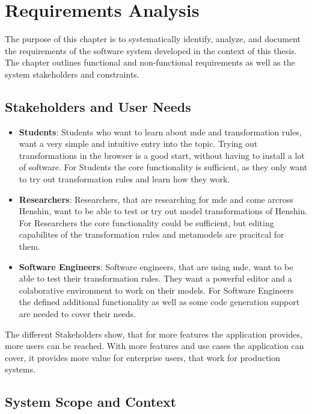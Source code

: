   \chapter{Requirements Analysis}
  \label{subsec:requirements}

  The purpose of this chapter is to systematically identify, analyze, and document the requirements of the software system developed in the context of this thesis. The chapter outlines functional and non-functional requirements as well as the system stakeholders and constraints.

\section{Stakeholders and User Needs}
  \label{subsec:stakeholders}

  \begin{itemize}
    \item \textbf{Students}: Students who want to learn about \ac{mde} and transformation rules, want a very simple and intuitive entry into the topic. Trying out transformations in the browser is a good start, without having to install a lot of software. For Students the core functionality is sufficient, as they only want to try out transformation rules and learn how they work.
    \item \textbf{Researchers}: Researchers, that are researching for \ac{mde} and come arcross Henshin, want to be able to test or try out model transformations of Henshin. For Researchers the core functionality could be sufficient, but editing capabilites of the transformation rules and metamodels are pracitcal for them.
    \item \textbf{Software Engineers}: Software engineers, that are using \ac{mde}, want to be able to test their transformation rules. They want a powerful editor and a colaborative environment to work on their models. For Software Engineers the defined additional functionality as well as some code generation support are needed to cover their needs.
  \end{itemize}

  The different Stakeholders show, that for more features the application provides, more users can be reached. With more features and use cases the application can cover, it provides more value for enterprise users, that work for production systems.

  \section{System Scope and Context}
  \label{subsec:system-scope}

